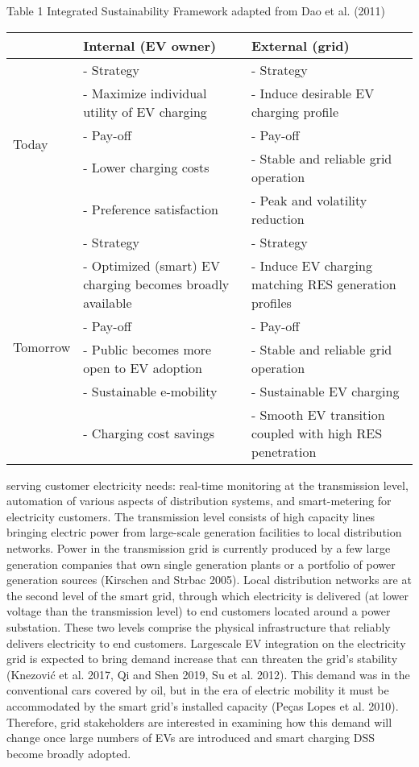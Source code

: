 \documentclass[10pt]{article}
\begin{document}
Table 1 Integrated Sustainability Framework adapted from Dao et al. (2011)

\begin{center}
\begin{tabular}{|l|l|l|}
\hline
 & Internal (EV owner) & External (grid) \\
\hline
\multirow[t]{5}{*}{Today} & - Strategy & - Strategy \\
\hline
 & - Maximize individual utility of EV charging & - Induce desirable EV charging profile \\
\hline
 & - Pay-off & - Pay-off \\
\hline
 & - Lower charging costs & - Stable and reliable grid operation \\
\hline
 & - Preference satisfaction & - Peak and volatility reduction \\
\hline
\multirow[t]{6}{*}{Tomorrow} & - Strategy & - Strategy \\
\hline
 & - Optimized (smart) EV charging becomes broadly available & - Induce EV charging matching RES generation profiles \\
\hline
 & - Pay-off & - Pay-off \\
\hline
 & - Public becomes more open to EV adoption & - Stable and reliable grid operation \\
\hline
 & - Sustainable e-mobility & - Sustainable EV charging \\
\hline
 & - Charging cost savings & - Smooth EV transition coupled with high RES penetration \\
\hline
\end{tabular}
\end{center}

serving customer electricity needs: real-time monitoring at the transmission level, automation of various aspects of distribution systems, and smart-metering for electricity customers. The transmission level consists of high capacity lines bringing electric power from large-scale generation facilities to local distribution networks. Power in the transmission grid is currently produced by a few large generation companies that own single generation plants or a portfolio of power generation sources (Kirschen and Strbac 2005). Local distribution networks are at the second level of the smart grid, through which electricity is delivered (at lower voltage than the transmission level) to end customers located around a power substation. These two levels comprise the physical infrastructure that reliably delivers electricity to end customers. Largescale EV integration on the electricity grid is expected to bring demand increase that can threaten the grid's stability (Knezović et al. 2017, Qi and Shen 2019, Su et al. 2012). This demand was in the conventional cars covered by oil, but in the era of electric mobility it must be accommodated by the smart grid's installed capacity (Peças Lopes et al. 2010). Therefore, grid stakeholders are interested in examining how this demand will change once large numbers of EVs are introduced and smart charging DSS become broadly adopted.
\end{document}
